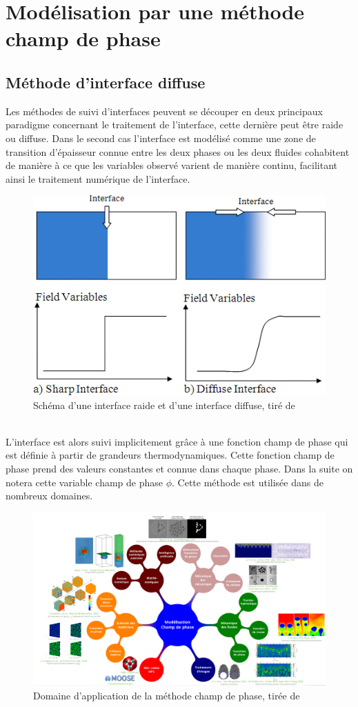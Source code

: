 \documentclass[a4paper,11pt]{report}    %
\begin{document}
\chapter{Modélisation par une méthode champ de phase}
\section{Méthode d'interface diffuse}

Les méthodes de suivi d'interfaces peuvent se découper en deux principaux paradigme concernant le traitement de l'interface, cette dernière peut être raide ou diffuse. Dans le second cas l'interface est modélisé comme une zone de transition d'épaisseur connue entre les deux phases ou les deux fluides cohabitent de manière à ce que les variables observé varient de manière continu, facilitant ainsi le traitement numérique de l'interface.
\begin{figure}[h!]
	\centering
	\includegraphics[width=0.3\linewidth]{figure/diffuse_interface}
	\caption[Schéma d'une interface raide et d'une interface diffuse]{Schéma d'une interface raide et d'une interface diffuse, tiré de \cite{samkhaniani_evaluation_2017}}
	\label{fig:diffuseinterface}
\end{figure} \\
L'interface est alors suivi implicitement grâce à une fonction champ de phase qui est définie à partir de grandeurs thermodynamiques. Cette fonction champ de phase prend des valeurs constantes et connue dans chaque phase. Dans la suite on notera cette variable champ de phase $\phi$. Cette méthode est utilisée dans de nombreux domaines.


\begin{figure}[h!]
	\centering
	\includegraphics[width=0.9\linewidth]{figure/champ_phase}
	\caption[Domaine d'application de la méthode champ de phase]{Domaine d'application de la méthode champ de phase, tirée de \cite{introini_suivi_nodate}}
	\label{fig:champphase}
\end{figure} 
\end{document}
